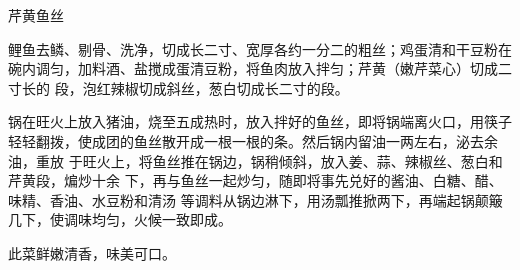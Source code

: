 %
%
%
%
%
%
%
\begin{recipe}{芹黄鱼丝}

\ingredients


\preparation

\step 鲤鱼去鳞、剔骨、洗净，切成长二寸、宽厚各约一分二的粗丝；鸡蛋清和干豆粉在
碗内调匀，加料酒、盐搅成蛋清豆粉，将鱼肉放入拌匀；芹黄（嫩芹菜心）切成二寸长的
段，泡红辣椒切成斜丝，葱白切成长二寸的段。

\step 锅在旺火上放入猪油，烧至五成热时，放入拌好的鱼丝，即将锅端离火口，用筷子
轻轻翻拨，使成团的鱼丝散开成一根一根的条。然后锅内留油一两左右，泌去余油，重放
于旺火上，将鱼丝推在锅边，锅稍倾斜，放入姜、蒜、辣椒丝、葱白和芹黄段，煸炒十余
下，再与鱼丝一起炒匀，随即将事先兑好的酱油、白糖、醋、味精、香油、水豆粉和清汤
等调料从锅边淋下，用汤瓢推掀两下，再端起锅颠簸几下，使调味均匀，火候一致即成。

\features

此菜鲜嫩清香，味美可口。

\end{recipe}

